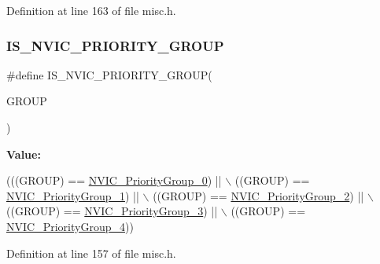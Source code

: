 Definition at line 163 of file misc.\+h.

\mbox{\label{group___preemption___priority___group_ga6569304a39fe4f91bd59b6a586c8ede9}} 
\subsubsection{\texorpdfstring{I\+S\+\_\+\+N\+V\+I\+C\+\_\+\+P\+R\+I\+O\+R\+I\+T\+Y\+\_\+\+G\+R\+O\+UP}{IS\_NVIC\_PRIORITY\_GROUP}}
{\footnotesize\ttfamily \#define I\+S\+\_\+\+N\+V\+I\+C\+\_\+\+P\+R\+I\+O\+R\+I\+T\+Y\+\_\+\+G\+R\+O\+UP(\begin{DoxyParamCaption}\item[{}]{G\+R\+O\+UP }\end{DoxyParamCaption})}

{\bfseries Value\+:}
\begin{DoxyCode}
(((GROUP) == \hyperlink{group___preemption___priority___group_gaeac0cf537f65d17bc19aee2410b2b60e}{NVIC\_PriorityGroup\_0}) || \(\backslash\)
                                       ((GROUP) == \hyperlink{group___preemption___priority___group_ga89bf0bf9e70f1a372a541b1b8d7493aa}{NVIC\_PriorityGroup\_1}) || \(\backslash\)
                                       ((GROUP) == \hyperlink{group___preemption___priority___group_ga505002e8b76aef65499ca371e40ec8b4}{NVIC\_PriorityGroup\_2}) || \(\backslash\)
                                       ((GROUP) == \hyperlink{group___preemption___priority___group_ga49bdbee77d4a70339d63c80462d49b4d}{NVIC\_PriorityGroup\_3}) || \(\backslash\)
                                       ((GROUP) == \hyperlink{group___preemption___priority___group_gaf9020c585da2a299328f0b06dee391a2}{NVIC\_PriorityGroup\_4}))
\end{DoxyCode}


Definition at line 157 of file misc.\+h.

\mbox{\label{group___preemption___priority___group_ga010705bc997dcff935b965b372cba61d}} 
